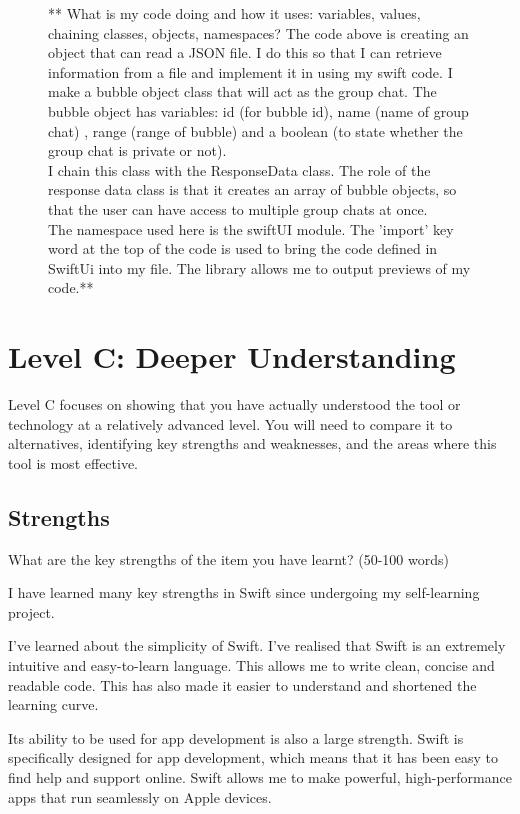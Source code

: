 \documentclass[a4paper, 11pt]{report}
\begin{document}
\begin{figure}
** What is my code doing and how it uses: variables, values, chaining classes, objects, namespaces?
The code above is creating an object that can read a JSON file. I do this so that I can retrieve information from a file and implement it in using my swift code. I make a bubble object class that will act as the group chat. The bubble object has variables: id (for bubble id), name (name of group chat) , range (range of bubble) and a boolean (to state whether the group chat is private or not). \\
I chain this class with the ResponseData class. The role of the response data class is that it creates an array of bubble objects, so that the user can have access to multiple group chats at once.\\
The namespace used here is the swiftUI module. The 'import' key word at the top of the code is used to bring the code defined in SwiftUi into my file. The library allows me to output previews of my code.**\\

\end{figure}

\newpage
\section{Level C: Deeper Understanding}

Level C focuses on showing that you have actually understood the tool or technology at a relatively advanced level. You will need to compare it to alternatives, identifying key strengths and weaknesses, and the areas where this tool is most effective. 

\subsection{Strengths}
What are the key strengths of the item you have learnt? (50-100 words)

I have learned many key strengths in Swift since undergoing my self-learning project.

I’ve learned about the simplicity of Swift. I’ve realised that Swift is an extremely intuitive and easy-to-learn language. This allows me to write clean, concise and readable code. This has also made it easier to understand and shortened the learning curve.

Its ability to be used for app development is also a large strength. Swift is specifically designed for app development, which means that it has been easy to find help and support online. Swift allows me to make powerful, high-performance apps that run seamlessly on Apple devices.
\end{document}
